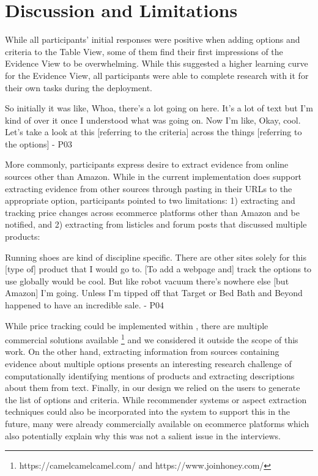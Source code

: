 \section{Discussion and Limitations}


While all participants’ initial responses were positive when adding options and criteria to the Table View, some of them find their first impressions of the Evidence View to be overwhelming. While this suggested a higher learning curve for the Evidence View, all participants were able to complete research with it for their own tasks during the deployment.

\begin{tightquote}
So initially it was like, Whoa, there's a lot going on here. It's a lot of text but I'm kind of over it  once I understood what was going on. Now I'm like, Okay, cool. Let's take a look at this [referring to the criteria] across the things [referring to the options] - P03
\end{tightquote}

More commonly, participants express desire to extract evidence from online sources other than Amazon. While in the current implementation does support extracting evidence from other sources through pasting in their URLs to the appropriate option, participants pointed to two limitations: 1) extracting and tracking price changes across ecommerce platforms other than Amazon and be notified, and 2) extracting from listicles and forum posts that discussed multiple products: 

\begin{tightquote}

Running shoes are kind of discipline specific. There are other sites solely for this [type of] product that I would go to. [To add a webpage and] track the options to use globally would be cool. But like robot vacuum there's nowhere else [but Amazon] I'm going. Unless I'm tipped off that Target or Bed Bath and Beyond happened to have an incredible sale. - P04

\end{tightquote}


While price tracking could be implemented within \SYSTEM, there are multiple commercial solutions available \footnote{https://camelcamelcamel.com/ and https://www.joinhoney.com/} and we considered it outside the scope of this work. On the other hand, extracting information from sources containing evidence about multiple options presents an interesting research challenge of computationally identifying mentions of products and extracting descriptions about them from text. 
Finally, in our design we relied on the users to generate the list of options and criteria. While recommender systems or aspect extraction techniques could also be incorporated into the system to support this in the future, many were already commercially available on ecommerce platforms which also potentially explain why this was not a salient issue in the interviews.

